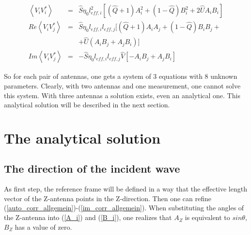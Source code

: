 \documentclass[a4paper,11pt]{report}
\begin{document}
\begin{eqnarray}
\left\langle V_i V_i^{*} \right\rangle &=& \hat{S}\eta_0 l_{eff,i}^2[(\hat{Q}+1) A^2_i + (1-\hat{Q}) B^2_i+ 2 \hat{U}A_i B_i]  \label{auto_corr_allgemein}\\
Re \left\langle V_i V_j^{*}\right\rangle &=& \hat{S}\eta_0 l_{eff,i} l_{eff,j}[(\hat{Q}+1) A_i A_j + (1-\hat{Q}) B_i B_j + \label{re_corr_allgemein}\\
& & + \hat{U} (A_i B_j + A_j B_i)] \nonumber \\
Im \left\langle V_i V_j^{*}\right\rangle &=& -\hat{S}\eta_0 l_{eff,i} l_{eff,j} \hat{V}[-A_i B_j + A_j B_i ] \label{im_corr_allgemein}
\end{eqnarray}

So for each pair of antennas, one gets a system of 3 equations with 8 unknown parameters. Clearly, with two antennas and one measurement, one cannot solve this system. With three antennas a solution exists, even an analytical one. This analytical solution will be described in the next section.

\section{The analytical solution}
\subsection{The direction of the incident wave}

As first step, the reference frame will be defined in a way that the effective length vector of the Z-antenna points in the Z-direction. Then one can refine (\ref{auto_corr_allgemein})-(\ref{im_corr_allgemein}).  When substituting the angles of the Z-antenna into (\ref{A_i}) and (\ref{B_i}), one realizes that $A_Z$ is equivalent to $sin \theta$, $B_Z$ has a value of zero.
\end{document}
